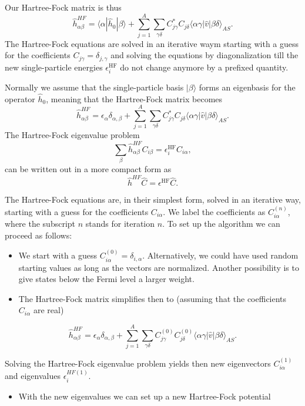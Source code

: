 \documentclass[%
oneside,                 %
final,                   %
10pt]{article}
\begin{document}
Our Hartree-Fock matrix  is thus
\[
\hat{h}_{\alpha\beta}^{HF}=\langle \alpha | \hat{h}_0 | \beta \rangle+
\sum_{j=1}^A\sum_{\gamma\delta} C^*_{j\gamma}C_{j\delta}\langle \alpha\gamma|\hat{v}|\beta\delta\rangle_{AS}.
\]
The Hartree-Fock equations are solved in an iterative waym starting with a guess for the coefficients $C_{j\gamma}=\delta_{j,\gamma}$ and solving the equations by diagonalization till the new single-particle energies
$\epsilon_i^{\mathrm{HF}}$ do not change anymore by a prefixed quantity. 




Normally we assume that the single-particle basis $|\beta\rangle$ forms an eigenbasis for the operator
$\hat{h}_0$, meaning that the Hartree-Fock matrix becomes  
\[
\hat{h}_{\alpha\beta}^{HF}=\epsilon_{\alpha}\delta_{\alpha,\beta}+
\sum_{j=1}^A\sum_{\gamma\delta} C^*_{j\gamma}C_{j\delta}\langle \alpha\gamma|\hat{v}|\beta\delta\rangle_{AS}.
\]
The Hartree-Fock eigenvalue problem
\[
\sum_{\beta}\hat{h}_{\alpha\beta}^{HF}C_{i\beta}=\epsilon_i^{\mathrm{HF}}C_{i\alpha},
\]
can be written out in a more compact form as
\[
\hat{h}^{HF}\hat{C}=\epsilon^{\mathrm{HF}}\hat{C}. 
\]




The Hartree-Fock equations are, in their simplest form, solved in an iterative way, starting with a guess for the
coefficients $C_{i\alpha}$. We label the coefficients as $C_{i\alpha}^{(n)}$, where the subscript $n$ stands for iteration $n$.
To set up the algorithm we can proceed as follows:

\begin{itemize}
 \item We start with a guess $C_{i\alpha}^{(0)}=\delta_{i,\alpha}$. Alternatively, we could have used random starting values as long as the vectors are normalized. Another possibility is to give states below the Fermi level a larger weight.

 \item The Hartree-Fock matrix simplifies then to (assuming that the coefficients $C_{i\alpha} $  are real)
\end{itemize}

\noindent
\[
\hat{h}_{\alpha\beta}^{HF}=\epsilon_{\alpha}\delta_{\alpha,\beta}+
\sum_{j = 1}^A\sum_{\gamma\delta} C_{j\gamma}^{(0)}C_{j\delta}^{(0)}\langle \alpha\gamma|\hat{v}|\beta\delta\rangle_{AS}.
\]




Solving the Hartree-Fock eigenvalue problem yields then new eigenvectors $C_{i\alpha}^{(1)}$ and eigenvalues
$\epsilon_i^{HF(1)}$. 
\begin{itemize}
 \item With the new eigenvalues we can set up a new Hartree-Fock potential 
\end{itemize}
\end{document}
